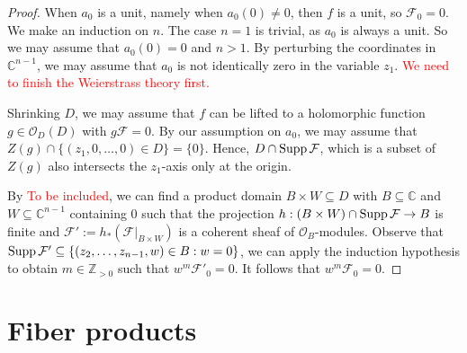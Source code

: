 \begin{proof}
    When $a_0$ is a unit, namely when $a_0(0)\neq 0$, then $f$ is a unit, so $\mathcal{F}_0=0$. We make an induction on $n$. The case $n=1$ is trivial, as $a_0$ is always a unit.
    So we may assume that $a_0(0)=0$ and $n>1$. By perturbing the coordinates in $\mathbb{C}^{n-1}$, we may assume that $a_0$ is not identically zero in the variable $z_1$. \textcolor{red}{We need to finish the Weierstrass theory first.}

    Shrinking $D$, we may assume that $f$ can be lifted to a holomorphic function $g\in \mathcal{O}_D(D)$ with $g\mathcal{F}=0$. By our assumption on $a_0$, we may assume that $Z(g)\cap \{(z_1,0,\ldots,0)\in D\}=\{0\}$. Hence, $D\cap \operatorname{Supp} \mathcal{F}$, which is a subset of $Z(g)$ also intersects the $z_1$-axis only at the origin.

    By \textcolor{red}{To be included}, we can find a product domain $B\times W\subseteq D$ with $B\subseteq \mathbb{C}$ and $W\subseteq \mathbb{C}^{n-1}$ containing $0$ such that the projection $h:(B\times W)\cap \operatorname{Supp} \mathcal{F}\rightarrow B$ is finite and $\mathcal{F}':=h_*(\mathcal{F}|_{B\times W})$ is a coherent sheaf of $\mathcal{O}_B$-modules. Observe that $\operatorname{Supp} \mathcal{F}'\subseteq \{(z_2,\ldots,z_{n-1},w)\in B:w=0\}$, we can apply the induction hypothesis to obtain $m\in \mathbb{Z}_{>0}$ such that $w^{m}\mathcal{F}'_0=0$. It follows that $w^{m}\mathcal{F}_0=0$.
\end{proof}

\section{Fiber products}

\printbibliography
